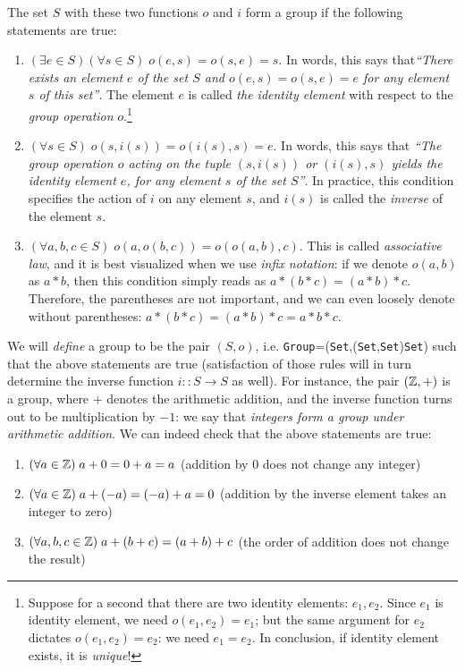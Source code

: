 The set $S$ with these two functions $o$ and $i$ form a group if the following statements are true:
\begin{enumerate}
	\item $\boxed{(\exists e\in S)(\forall s\in S)\; o(e,s)=o(s,e)=s}$. In words, this says that\linebreak \emph{``There exists an element $e$ of the set $S$ and $o(e,s)=o(s,e)=e$ for any element $s$ of this set''}. The element $e$ is called \emph{the identity element} with respect to the \emph{group operation} $o$.\footnote{Suppose for a second that there are two identity elements: $e_1,e_2$. Since $e_1$ is identity element, we need $o(e_1,e_2)=e_1$; but the same argument for $e_2$ dictates $o(e_1,e_2)=e_2$: we need $e_1=e_2$. In conclusion, if identity element exists, it is \emph{unique}!}
	\item  $\boxed{(\forall s \in S)\; o(s,i(s))=o(i(s),s)=e}$. In words, this says that \emph{``The group operation $o$ acting on the tuple $(s,i(s))$ or $(i(s),s)$ yields the identity element $e$, for any element $s$ of the set $S$''}. In practice, this condition specifies the action of $i$ on any element $s$, and $i(s)$ is called the \emph{inverse} of the element $s$.
	\item $\boxed{(\forall a,b,c \in S)\; o(a,o(b,c))=o(o(a,b),c)}$. This is called \emph{associative law}, and it is best visualized when we use \emph{infix notation}: if we denote $o(a,b)$ as $a*b$, then this condition simply reads as $a*(b*c)=(a*b)*c$. Therefore, the parentheses are not important, and we can even loosely denote without parentheses: $a*(b*c)=(a*b)*c=a*b*c$.
\end{enumerate}

We will \emph{define} a group to be the pair $(S,o)$, i.e.
\be 
\texttt{Group}=\Big(\texttt{Set},\;(\texttt{Set},\texttt{Set})\to\texttt{Set}\Big)
\ee 
such that the above statements are true (satisfaction of those rules will in turn determine the inverse function $i::S\to S$ as well). For instance, the pair $(\mathbb{Z},+)$ is a group, where $+$ denotes the arithmetic addition, and the inverse function turns out to be multiplication by $-1$: we say that \emph{integers form a group under arithmetic addition}. We can indeed check that the above statements are true:
\begin{enumerate}
	\item $(\forall a\in \mathbb{Z})\; a+0=0+a=a$ (addition by $0$ does not change any integer)
	\item $(\forall a\in \mathbb{Z})\; a+(-a)=(-a)+a=0$ (addition by the inverse element takes an integer to zero)
	\item $(\forall a,b,c \in \mathbb{Z})\; a+(b+c)=(a+b)+c$ (the order of addition does not change the result)
\end{enumerate}

